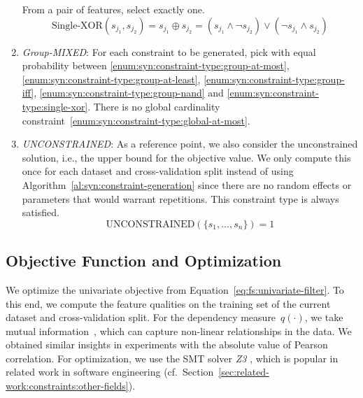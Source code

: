 \begin{enumerate}[label=(T\arabic*), wide, noitemsep]
	From a pair of features, select exactly one.
	\begin{equation}
		\text{Single-XOR}(s_{j_1}, s_{j_2}) = s_{j_1} \oplus s_{j_2} = (s_{j_1} \land \lnot s_{j_2}) \lor (\lnot s_{j_1} \land s_{j_2})
		\label{eq:syn:constraint:single-xor}
	\end{equation}
	\item\label{enum:syn:constraint-type:group-mixed} \emph{Group-MIXED}:
	For each constraint to be generated, pick with equal probability between \ref{enum:syn:constraint-type:group-at-most}, \ref{enum:syn:constraint-type:group-at-least}, \ref{enum:syn:constraint-type:group-iff}, \ref{enum:syn:constraint-type:group-nand} and \ref{enum:syn:constraint-type:single-xor}.
	There is no global cardinality constraint~\ref{enum:syn:constraint-type:global-at-most}.
	\item\label{enum:syn:constraint-type:unconstrained} \emph{UNCONSTRAINED}:
	As a reference point, we also consider the unconstrained solution, i.e., the upper bound for the objective value.
	We only compute this once for each dataset and cross-validation split instead of using Algorithm~\ref{al:syn:constraint-generation} since there are no random effects or parameters that would warrant repetitions.
	This constraint type is always satisfied.
	\begin{equation}
		\text{UNCONSTRAINED}(\{s_1, \dots, s_n\}) = 1
		\label{eq:syn:constraint:unconstrained}
	\end{equation}
\end{enumerate}

\subsection{Objective Function and Optimization}
\label{sec:syn:experimental-design:objective}

We optimize the univariate objective from Equation~\ref{eq:fs:univariate-filter}.
To this end, we compute the feature qualities on the training set of the current dataset and cross-validation split.
For the dependency measure~$q(\cdot)$, we take mutual information~\cite{kraskov2004estimating}, which can capture non-linear relationships in the data.
We obtained similar insights in experiments with the absolute value of Pearson correlation.
For optimization, we use the SMT solver \emph{Z3} \cite{bjorner2015nuz, deMoura2008z3}, which is popular in related work in software engineering (cf.~Section~\ref{sec:related-work:constraints:other-fields}).

